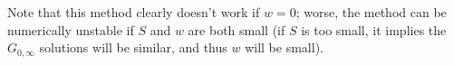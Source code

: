 \documentclass[10pt,twocolumn,a4paper]{article}%
\begin{document}
Note that this method clearly doesn't work if $w=0$; worse, the method can be numerically unstable if $S$ and $w$ are both small (if $S$ is too small, it implies the $G_{0,\infty}$ solutions will be similar, and thus $w$ will be small).
%
%
%
%
%
%
\end{document}

